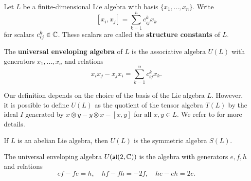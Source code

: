     
    
    
    


Let $L$ be a finite-dimensional Lie algebra with
basis $\{x_1,\dots,x_n\}$. Write
\[
[x_i,x_j]=\sum_{k=1}^n c^k_{ij}x_k
\]
for scalars $c_{ij}^k\in\mathbb{C}$. 
These scalars are called 
the \textbf{structure constants} of $L$. 

The \textbf{universal enveloping algebra} of $L$ 
is the associative algebra $U(L)$ with generators 
$x_1,\dots,x_n$ and relations 
\[
x_ix_j-x_jx_i=\sum_{k=1}^n c_{ij}^kx_k.
\]

Our definition depends on the choice of the basis of the Lie algebra $L$. 
However, it is possible to define $U(L)$ as the quotient 
of the tensor algebra $T(L)$ by the ideal $I$ 
generated by $x\otimes y-y\otimes x-[x,y]$ for all $x,y\in L$.  We refer 
to \cite[Chapter V]{MR1321145} for more details. 

\begin{example}
    If $L$ is an abelian Lie algebra, then $U(L)$ is 
    the symmetric algebra $S(L)$. 
\end{example}

\begin{example}
    The universal enveloping algebra $U(\mathfrak{sl}(2,\mathbb{C}))$ 
    is the algebra with generators $e,f,h$ and relations 
    \[
    ef-fe=h,\quad
    hf-fh=-2f,\quad
    he-eh=2e.
    \]
\end{example}


